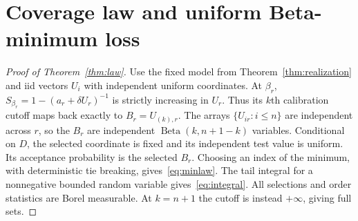 \documentclass[10pt]{article}
\theoremstyle{definition}\newtheorem{definition}[theorem]{Definition}
\theoremstyle{remark}\newtheorem{remark}[theorem]{Remark}
\newcommand{\1}{\mathbf 1}
\newcommand{\Beta}{\operatorname{Beta}}
\begin{document}
\section{Coverage law and uniform Beta-minimum loss}\label{app:beta}
\begin{proof}[Proof of Theorem~\ref{thm:law}]
Use the fixed model from Theorem~\ref{thm:realization} and iid vectors $U_i$ with independent uniform coordinates. At $\beta_r$, $S_{\beta_r}=1-(a_r+\delta U_r)^{-1}$ is strictly increasing in $U_r$. Thus its $k$th calibration cutoff maps back exactly to $B_r=U_{(k),r}$. The arrays $\{U_{ir}:i\le n\}$ are independent across $r$, so the $B_r$ are independent $\Beta(k,n+1-k)$ variables. Conditional on $D$, the selected coordinate is fixed and its independent test value is uniform. Its acceptance probability is the selected $B_r$. Choosing an index of the minimum, with deterministic tie breaking, gives~\eqref{eq:minlaw}. The tail integral for a nonnegative bounded random variable gives~\eqref{eq:integral}. All selections and order statistics are Borel measurable. At $k=n+1$ the cutoff is instead $+\infty$, giving full sets.
\end{proof}
\end{document}
